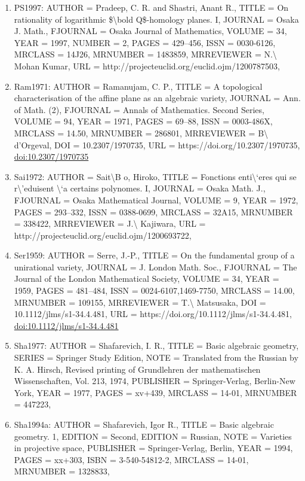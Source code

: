 \documentclass[11pt]{article}
\begin{document}
\begin{enumerate}[leftmargin=*]
  \item PS1997: AUTHOR = Pradeep, C. R. and Shastri, Anant R., TITLE = On rationality of logarithmic \$\textbackslash{}bold Q\$-homology planes. I, JOURNAL = Osaka J. Math., FJOURNAL = Osaka Journal of Mathematics, VOLUME = 34, YEAR = 1997, NUMBER = 2, PAGES = 429--456, ISSN = 0030-6126, MRCLASS = 14J26, MRNUMBER = 1483859, MRREVIEWER = N.\textbackslash{} Mohan Kumar, URL = http://projecteuclid.org/euclid.ojm/1200787503,
  \item Ram1971: AUTHOR = Ramanujam, C. P., TITLE = A topological characterisation of the affine plane as an algebraic variety, JOURNAL = Ann. of Math. (2), FJOURNAL = Annals of Mathematics. Second Series, VOLUME = 94, YEAR = 1971, PAGES = 69--88, ISSN = 0003-486X, MRCLASS = 14.50, MRNUMBER = 286801, MRREVIEWER = B\textbackslash{} d'Orgeval, DOI = 10.2307/1970735, URL = https://doi.org/10.2307/1970735, \href{https://doi.org/10.2307/1970735}{doi:10.2307/1970735}
  \item Sai1972: AUTHOR = Sait\textbackslash{}B o, Hiroko, TITLE = Fonctions enti\textbackslash{}`eres qui se r\textbackslash{}'eduisent \textbackslash{}`a certains polynomes. I, JOURNAL = Osaka Math. J., FJOURNAL = Osaka Mathematical Journal, VOLUME = 9, YEAR = 1972, PAGES = 293--332, ISSN = 0388-0699, MRCLASS = 32A15, MRNUMBER = 338422, MRREVIEWER = J.\textbackslash{} Kajiwara, URL = http://projecteuclid.org/euclid.ojm/1200693722,
  \item Ser1959: AUTHOR = Serre, J.-P., TITLE = On the fundamental group of a unirational variety, JOURNAL = J. London Math. Soc., FJOURNAL = The Journal of the London Mathematical Society, VOLUME = 34, YEAR = 1959, PAGES = 481--484, ISSN = 0024-6107,1469-7750, MRCLASS = 14.00, MRNUMBER = 109155, MRREVIEWER = T.\textbackslash{} Matsusaka, DOI = 10.1112/jlms/s1-34.4.481, URL = https://doi.org/10.1112/jlms/s1-34.4.481, \href{https://doi.org/10.1112/jlms/s1-34.4.481}{doi:10.1112/jlms/s1-34.4.481}
  \item Sha1977: AUTHOR = Shafarevich, I. R., TITLE = Basic algebraic geometry, SERIES = Springer Study Edition, NOTE = Translated from the Russian by K. A. Hirsch, Revised printing of Grundlehren der mathematischen Wissenschaften, Vol. 213, 1974, PUBLISHER = Springer-Verlag, Berlin-New York, YEAR = 1977, PAGES = xv+439, MRCLASS = 14-01, MRNUMBER = 447223,
  \item Sha1994a: AUTHOR = Shafarevich, Igor R., TITLE = Basic algebraic geometry. 1, EDITION = Second, EDITION = Russian, NOTE = Varieties in projective space, PUBLISHER = Springer-Verlag, Berlin, YEAR = 1994, PAGES = xx+303, ISBN = 3-540-54812-2, MRCLASS = 14-01, MRNUMBER = 1328833,

\end{enumerate}
\end{document}
